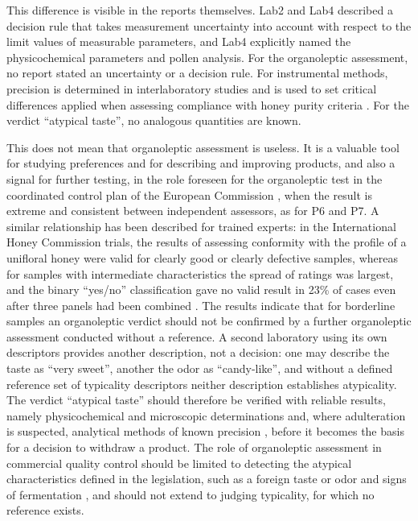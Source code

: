 This difference is visible in the reports themselves. Lab2 and Lab4 described
a decision rule that takes measurement uncertainty into account
\cite[clause~7.8.6]{ISO17025} with respect to the limit values of measurable
parameters, and Lab4 explicitly named the physicochemical parameters and
pollen analysis. For the organoleptic assessment, no report stated an
uncertainty or a decision rule. For instrumental methods, precision is
determined in interlaboratory studies and is used to set critical differences
applied when assessing compliance with honey purity criteria
\cite{Ulberth2024}. For the verdict ``atypical taste'', no analogous
quantities are known.

This does not mean that organoleptic assessment is useless. It is a valuable
tool for studying preferences and for describing and improving products, and
also a signal for further testing, in the role foreseen for the organoleptic
test in the coordinated control plan of the European Commission
\cite{KE2015PlanKontroli}, when the result is extreme and consistent between
independent assessors, as for P6 and P7. A similar relationship has been
described for trained experts: in the International Honey Commission trials,
the results of assessing conformity with the profile of a unifloral honey were
valid for clearly good or clearly defective samples, whereas for samples with
intermediate characteristics the spread of ratings was largest, and the binary
``yes/no'' classification gave no valid result in 23\% of cases even after
three panels had been combined \cite{Piana2004}. The results indicate that for
borderline samples an organoleptic verdict should not be confirmed by a further
organoleptic assessment conducted without a reference. A second laboratory
using its own descriptors provides another description, not a decision: one
may describe the taste as ``very sweet'', another the odor as ``candy-like'',
and without a defined reference set of typicality descriptors neither
description establishes atypicality. The verdict ``atypical taste'' should
therefore be verified with reliable results, namely physicochemical and
microscopic determinations and, where adulteration is suspected, analytical
methods of known precision \cite{Ulberth2024}, before it becomes the basis for
a decision to withdraw a product. The role of organoleptic assessment in
commercial quality control should be limited to detecting the atypical
characteristics defined in the legislation, such as a foreign taste or odor
and signs of fermentation \cite{Dyrektywa2001110,RozporzadzenieMRiRW2009},
and should not extend to judging typicality, for which no reference exists.

